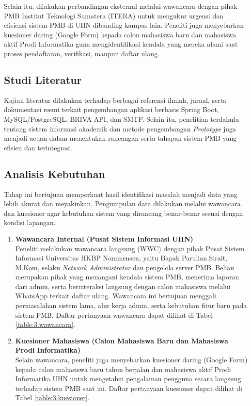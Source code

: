 Selain itu, dilakukan perbandingan eksternal melalui wawancara dengan pihak PMB Institut Teknologi Sumatera (ITERA) untuk mengukur urgensi dan efisiensi sistem PMB di UHN dibanding kampus lain. Peneliti juga menyebarkan kuesioner daring (Google Form) kepada calon mahasiswa baru dan mahasiswa aktif Prodi Informatika guna mengidentifikasi kendala yang mereka alami saat proses pendaftaran, verifikasi, maupun daftar ulang.\par

\subsection{Studi Literatur} \label{III.StudiLiteratur}
Kajian literatur dilakukan terhadap berbagai referensi ilmiah, jurnal, serta dokumentasi resmi terkait pengembangan aplikasi berbasis Spring Boot, MySQL/PostgreSQL, BRIVA API, dan SMTP. Selain itu, penelitian terdahulu tentang sistem informasi akademik dan metode pengembangan \textit{Prototype} juga menjadi acuan dalam menentukan rancangan serta tahapan sistem PMB yang efisien dan terintegrasi.\par

\subsection{Analisis Kebutuhan} \label{III.AnalisisKebutuhan}
Tahap ini bertujuan memperkuat hasil identifikasi masalah menjadi data yang lebih akurat dan meyakinkan. Pengumpulan data dilakukan melalui wawancara dan kuesioner agar kebutuhan sistem yang dirancang benar-benar sesuai dengan kondisi lapangan.\par

\begin{enumerate}[noitemsep]
	\item \textbf{Wawancara Internal (Pusat Sistem Informasi UHN)}\\
	Peneliti melakukan wawancara langsung (WWC) dengan pihak Pusat Sistem Informasi Universitas HKBP Nommensen, yaitu Bapak Parulian Sirait, M.Kom, selaku \textit{Network Administrator} dan pengelola server PMB. Beliau merupakan pihak yang menangani kendala sistem PMB, menerima laporan dari admin, serta berinteraksi langsung dengan calon mahasiswa melalui WhatsApp terkait daftar ulang. Wawancara ini bertujuan menggali permasalahan sistem lama, alur kerja admin, serta kebutuhan fitur baru pada sistem PMB. Daftar pertanyaan wawancara dapat dilihat di Tabel \ref{table:3.wawancara}.
	
	\item \textbf{Kuesioner Mahasiswa (Calon Mahasiswa Baru dan Mahasiswa Prodi Informatika)}\\
	Selain wawancara, peneliti juga menyebarkan kuesioner daring (Google Form) kepada calon mahasiswa baru tahun berjalan dan mahasiswa aktif Prodi Informatika UHN untuk mengetahui pengalaman pengguna secara langsung terhadap sistem PMB saat ini. Daftar pertanyaan kuesioner dapat dilihat di Tabel \ref{table:3.kuesioner}.
\end{enumerate}

